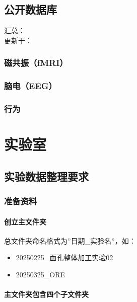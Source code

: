 \documentclass[]{ctexbook}
\providecommand{\tightlist}{%
  \setlength{\itemsep}{0pt}\setlength{\parskip}{0pt}}
\theoremstyle{definition}
\theoremstyle{definition}
\theoremstyle{definition}
\theoremstyle{definition}
\theoremstyle{remark}
\begin{document}
\chapter{公开数据库}\label{opendata}

汇总：\\
更新于：

\section{磁共振（fMRI）}\label{ux78c1ux5171ux632ffmri}

\section{脑电（EEG）}\label{ux8111ux7535eeg}

\section{行为}\label{ux884cux4e3a}

\part{实验室}\label{part-ux5b9eux9a8cux5ba4}

\chapter{实验数据整理要求}\label{dataarchive}

\section{准备资料}\label{ux51c6ux5907ux8d44ux6599}

\subsection{创立主文件夹}\label{ux521bux7acbux4e3bux6587ux4ef6ux5939}

总文件夹命名格式为''日期\_实验名''，如：

\begin{itemize}
\tightlist
\item
  20250225\_面孔整体加工实验02
\item
  20250325\_ORE
\end{itemize}

\subsection{主文件夹包含四个子文件夹}\label{ux4e3bux6587ux4ef6ux5939ux5305ux542bux56dbux4e2aux5b50ux6587ux4ef6ux5939}
\end{document}
